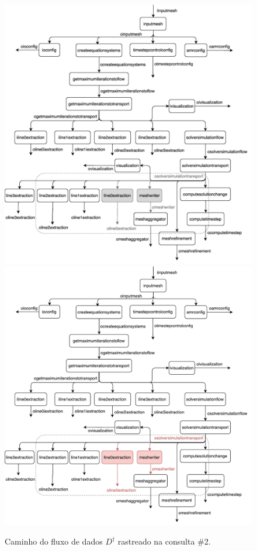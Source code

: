 \begin{figure}[htb]
    \centering
    \ifprint
    \includegraphics[width=\textwidth]{img/experiments-dataflow-2_bw}
    \else
    \includegraphics[width=\textwidth]{img/experiments-dataflow-2}
    \fi
    \caption[Caminho do fluxo de dados \(D^{\dagger}\) rastreado na consulta \#2]{Caminho do fluxo de dados \(D^{\dagger}\) rastreado na consulta \#2.}%
    \label{fig:experiments-dataflow-2}
\end{figure}


